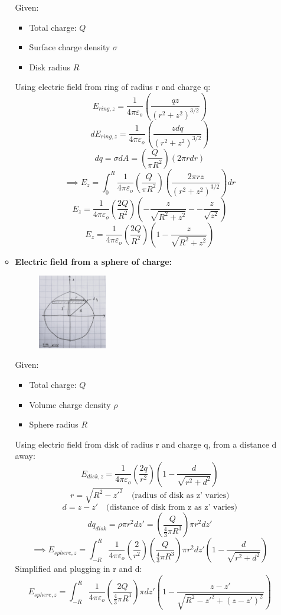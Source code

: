 \documentclass[12pt]{article}
\begin{document}
\begin{enumerate}
\begin{itemize}
\begin{figure}[H]
        \end{figure}
        Given:
        \begin{itemize}
            \item Total charge: $Q$
            \item Surface charge density $\sigma$
            \item Disk radius $R$
        \end{itemize}
Using electric field from ring of radius r and charge q:
\[E_{ring,z} = \frac{1}{4\pi\varepsilon_o} \left( \frac{qz}{(r^2+z^2)^{3/2}} \right)\]
\[dE_{ring,z}=\frac{1}{4\pi\varepsilon_o} \left( \frac{zdq}{(r^2+z^2)^{3/2}} \right)\]
\[dq=\sigma dA =\left(\frac{Q}{\pi R^2}\right)\left(2\pi r dr\right)\]
\[\implies E_z=\int_{0}^{R}\frac{1}{4\pi\varepsilon_o}\left(\frac{Q}{\pi R^2}\right)\left(\frac{2\pi rz}{(r^2+z^2)^{3/2}}\right)dr\]
\[E_z=\frac{1}{4\pi\varepsilon_o}\left(\frac{2Q}{R^2}\right)\left(-\frac{z}{\sqrt{R^2+z^2}}--\frac{z}{\sqrt{z^2}}\right)\]
\[\boxed{E_z=\frac{1}{4\pi\varepsilon_o}\left(\frac{2Q}{R^2}\right)\left(1-\frac{z}{\sqrt{R^2+z^2}}\right)}\]
\newpage
        \item \textbf{Electric field from a sphere of charge:}
        \begin{figure}[H]
            \centering
            \includegraphics[width=0.3\textwidth]{sphere.jpg}
        \end{figure}
        Given:
        \begin{itemize}
            \item Total charge: $Q$
            \item Volume charge density $\rho$
            \item Sphere radius $R$
        \end{itemize}
Using electric field from disk of radius r and charge q, from a distance d away:
\[E_{disk,z}=\frac{1}{4\pi\varepsilon_o}\left(\frac{2q}{r^2}\right)\left(1-\frac{d}{\sqrt{r^2+d^2}}\right)\]
\[r=\sqrt{R^2-z'^2} \quad \text{(radius of disk as z' varies)}\]
\[d=z-z' \quad \text{(distance of disk from z as z' varies)}\]
\[dq_{disk}=\rho \pi r^2dz'=\left(\frac{Q}{\frac{4}{3}\pi R^3}\right)\pi r^2dz'\]
\[\implies E_{sphere,z}=\int_{-R}^{R}\frac{1}{4\pi\varepsilon_o}\left(\frac{2}{r^2}\right)\left(\frac{Q}{\frac{4}{3}\pi R^3}\right)\pi r^2dz'\left(1-\frac{d}{\sqrt{r^2+d^2}}\right)\]
Simplified and plugging in r and d:
\[E_{sphere,z}=\int_{-R}^{R}\frac{1}{4\pi\varepsilon_o}\left(\frac{2Q}{\frac{4}{3}\pi R^3}\right)\pi dz'\left(1-\frac{z-z'}{\sqrt{R^2-z'^2+(z-z')^2}}\right)\]


\end{itemize}
\end{enumerate}
\end{document}
